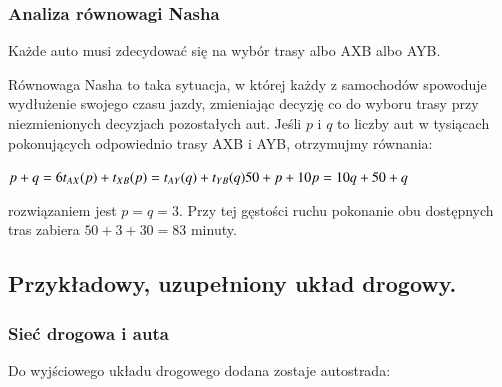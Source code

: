 \documentclass[twoside,12pt]{report}
\begin{document}
\subsubsection{Analiza równowagi Nasha}

Każde auto musi zdecydować się na wybór trasy albo AXB albo AYB.

Równowaga Nasha to taka sytuacja, w której każdy z samochodów spowoduje wydłużenie swojego czasu jazdy, zmieniając decyzję co do wyboru trasy przy niezmienionych decyzjach pozostałych aut.
\newline\newline
Jeśli $p$ i $q$ to liczby aut w tysiącach pokonujących odpowiednio trasy AXB i AYB, otrzymujmy równania:

\begin{center}
\begin{math}
p+q = 6 \newline
t_{AX}(p)+t_{XB}(p) = t_{AY}(q) + t_{YB}(q) \newline
50+p+10p = 10q+50+q \newline
\end{math}
\end{center}
rozwiązaniem jest $p=q=3$.
Przy tej gęstości ruchu pokonanie obu dostępnych tras zabiera $50+3+30=83$ minuty.

\subsection{Przykładowy, uzupełniony układ drogowy.}
\subsubsection{Sieć drogowa i auta}
Do wyjściowego układu drogowego dodana zostaje autostrada:
\end{document}
